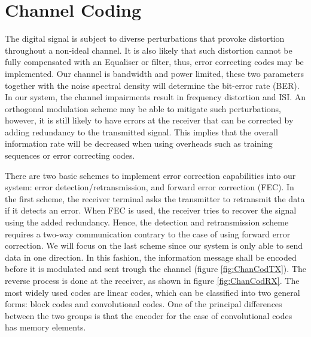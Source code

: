 \documentclass[12pt,a4paper,openright]{report}
\begin{document}
\section{Channel Coding}
\label{sec:channcod}
The digital signal is subject to diverse perturbations that provoke distortion throughout a non-ideal channel. It is also likely that such distortion  cannot be fully compensated with an Equaliser or filter, thus, error correcting codes may be implemented. Our channel is bandwidth and power limited, these two parameters together with the noise spectral density will determine the bit-error rate (BER)\cite{HaykinBook}. In our system, the channel impairments result in frequency distortion and ISI. An orthogonal  modulation scheme may be able to mitigate such perturbations, however, it is still likely to have errors at the receiver that can be corrected by adding redundancy to the transmitted signal. This implies that the overall information rate will be decreased when using overheads such as training sequences or error correcting codes.
 
 There are two basic schemes to implement error correction capabilities into our system: error detection/retransmission, and forward error correction (FEC)\cite{SklarBook}. In the first scheme, the receiver terminal asks the transmitter to retransmit the data if it detects an error. When FEC is used, the receiver tries to recover the signal using the added redundancy. Hence, the detection and retransmission scheme requires a two-way communication contrary to the case of using forward error correction. We will focus on the last scheme since our system is only able to send data in one direction. In this fashion, the information message shall be encoded before it is modulated and sent trough the channel (figure \ref{fig:ChanCodTX}). The reverse process is done at the receiver, as shown in figure \ref{fig:ChanCodRX}. The most widely used codes are linear codes, which can be classified into two general forms: block codes and convolutional codes. One of the principal differences between the two groups is that the encoder for the case of convolutional codes has memory elements.
 
\end{document}
